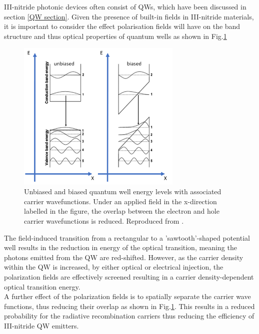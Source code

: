 III-nitride photonic devices often consist of QWs, which have been discussed in section \ref{QW section}. Given the presence of built-in fields in III-nitride materials, it is important to consider the effect polarisation fields will have on the band structure and thus optical properties of quantum wells as shown in Fig.\ref{1.5}

\begin{figure}[h]
	\centering
	\includegraphics[width=0.7\textwidth]{Figs/Ch1/QCSE.png}
	\caption {Unbiased and biased quantum well energy levels with associated carrier wavefunctions. Under an applied field in the x-direction labelled in the figure, the overlap between the electron and hole carrier wavefunctions is reduced. Reproduced from \cite{Ryou2009}.}
	\label{1.5}
\end{figure}
\FloatBarrier 

The field-induced transition from a rectangular to a 'sawtooth'-shaped potential well results in the reduction in energy of the optical transition, meaning the photons emitted from the QW are red-shifted. However, as the carrier density within the QW is increased, by either optical or electrical injection, the polarization fields are effectively screened resulting in a carrier density-dependent optical transition energy.\\
A further effect of the polarization fields is to spatially separate the carrier wave functions, thus reducing their overlap as shown in Fig.\ref{1.5}. This results in a reduced probability for the radiative recombination carriers thus reducing the efficiency of III-nitride QW emitters.
